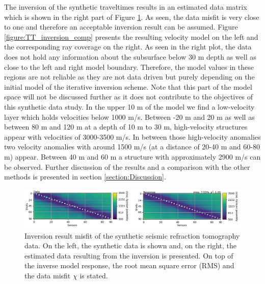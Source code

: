The inversion of the synthetic traveltimes results in an estimated data matrix which is shown in the right part of Figure \ref{figure:TT_inversion_misfits}. As seen, the data misfit is very close to one and therefore an acceptable inversion result can be assumed. Figure \ref{figure:TT_inversion_comp} presents the resulting velocity model on the left and the corresponding ray coverage on the right. As seen in the right plot, the data does not hold any information about the subsurface below 30 m depth as well as close to the left and right model boundary. Therefore, the model values in these regions are not reliable as they are not data driven but purely depending on the initial model of the iterative inversion scheme. Note that this part of the model space will not be discussed further as it does not contribute to the objectives of this synthetic data study. In the upper 10 m of the model we find a low-velocity layer which holds velocities below 1000 m/s. Between -20 m and 20 m as well as between 80 m and 120 m at a depth of 10 m to 30 m, high-velocity structures appear with velocities of 3000-3500 m/s. In between those high-velocity anomalies two velocity anomalies with around 1500 m/s (at a distance of 20-40 m and 60-80 m) appear. Between 40 m and 60 m a structure with approximately 2900 m/s can be observed. Further discussion of the results and a comparison with the other methods is presented in section \ref{section:Discussion}.

\begin{figure}[]
  \centering
    \includegraphics[width=\textwidth]{Figures/TT_RF_labels.png}
    \caption[Traveltime inversion result misfit]{Inversion result misfit of the synthetic seismic refraction tomography data. On the left, the synthetic data is shown and, on the right, the estimated data resulting from the inversion is presented. On top of the inverse model response, the root mean square error (RMS) and the data misfit $\chi$ is stated.}
    \label{figure:TT_inversion_misfits}
\end{figure}

